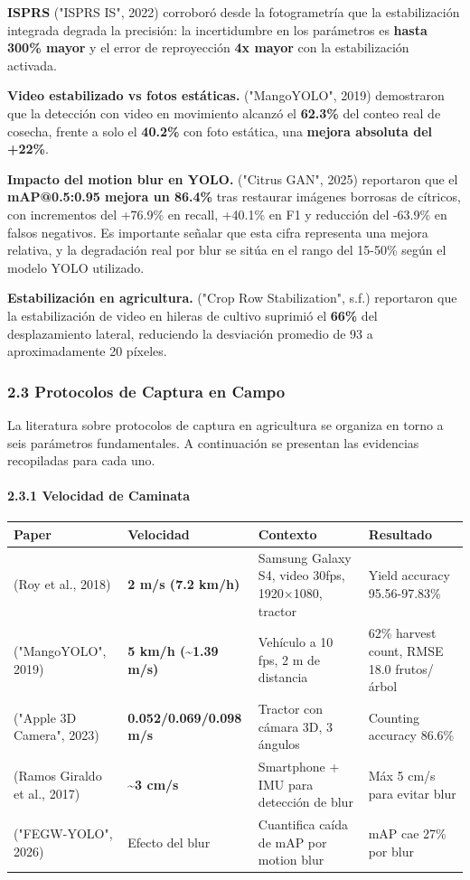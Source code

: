 \textbf{ISPRS} ("ISPRS IS", 2022) corroboró desde la fotogrametría que la estabilización integrada degrada la precisión: la incertidumbre en los parámetros es \textbf{hasta 300\% mayor} y el error de reproyección \textbf{4x mayor} con la estabilización activada.


\textbf{Video estabilizado vs fotos estáticas.} ("MangoYOLO", 2019) demostraron que la detección con video en movimiento alcanzó el \textbf{62.3\%} del conteo real de cosecha, frente a solo el \textbf{40.2\%} con foto estática, una \textbf{mejora absoluta del +22\%}.


\textbf{Impacto del motion blur en YOLO.} ("Citrus GAN", 2025) reportaron que el \textbf{mAP@0.5:0.95 mejora un 86.4\%} tras restaurar imágenes borrosas de cítricos, con incrementos del +76.9\% en recall, +40.1\% en F1 y reducción del -63.9\% en falsos negativos. Es importante señalar que esta cifra representa una mejora relativa, y la degradación real por blur se sitúa en el rango del 15-50\% según el modelo YOLO utilizado.


\textbf{Estabilización en agricultura.} ("Crop Row Stabilization", s.f.) reportaron que la estabilización de video en hileras de cultivo suprimió el \textbf{66\%} del desplazamiento lateral, reduciendo la desviación promedio de 93 a aproximadamente 20 píxeles.


\subsubsection{2.3 Protocolos de Captura en Campo}


La literatura sobre protocolos de captura en agricultura se organiza en torno a seis parámetros fundamentales. A continuación se presentan las evidencias recopiladas para cada uno.


\paragraph{2.3.1 Velocidad de Caminata}



\begin{tabular}{llll}
\hline
Paper & Velocidad & Contexto & Resultado \\
\hline
(Roy et al., 2018) & \textbf{2 m/s (7.2 km/h)} & Samsung Galaxy S4, video 30fps, 1920×1080, tractor & Yield accuracy 95.56-97.83\% \\
("MangoYOLO", 2019) & \textbf{5 km/h (\textasciitilde{}1.39 m/s)} & Vehículo a 10 fps, 2 m de distancia & 62\% harvest count, RMSE 18.0 frutos/árbol \\
("Apple 3D Camera", 2023) & \textbf{0.052/0.069/0.098 m/s} & Tractor con cámara 3D, 3 ángulos & Counting accuracy 86.6\% \\
(Ramos Giraldo et al., 2017) & \textbf{\textasciitilde{}3 cm/s} & Smartphone + IMU para detección de blur & Máx 5 cm/s para evitar blur \\
("FEGW-YOLO", 2026) & Efecto del blur & Cuantifica caída de mAP por motion blur & mAP cae 27\% por blur \\
\hline
\end{tabular}



